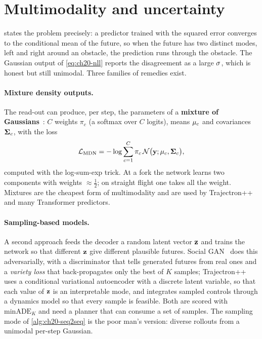 \section{Multimodality and uncertainty}
\label{sec:ch20-multimodal}

 states the problem precisely: a predictor
trained with the squared error converges to the conditional mean of the
future, so when the future has two distinct modes, left and right around an
obstacle, the prediction runs through the obstacle. The Gaussian output of
\cref{eq:ch20-nll} reports the disagreement as a large $\mathbf{\sigma}$, which
is honest but still unimodal. Three families of remedies exist.

\paragraph{Mixture density outputs.}
%
The read-out can produce, per step, the parameters of a \textbf{mixture of
Gaussians}~\cite{bishop1994mixture}: $C$ weights $\pi_c$ (a softmax over $C$
logits), means $\mathbf{\mu}_c$ and covariances $\mathbf{\Sigma}_c$, with the loss
\begin{equation}
  \mathcal{L}_{\mathrm{MDN}} = -\log \sum_{c=1}^{C} \pi_c\, \mathcal{N}\bigl(\mathbf{y}; \mathbf{\mu}_c, \mathbf{\Sigma}_c\bigr),
  \label{eq:ch20-mdn}
\end{equation}
computed with the log-sum-exp trick. At a fork the network learns two
components with weights $\approx \tfrac12$; on straight flight one takes all
the weight. Mixtures are the cheapest form of multimodality and are used by
Trajectron++ and many Transformer predictors.

\paragraph{Sampling-based models.}
%
A second approach feeds the decoder a random latent vector $\mathbf{z}$ and
trains the network so that different $\mathbf{z}$ give different plausible
futures. Social GAN~\cite{gupta2018social} does this adversarially, with a
discriminator that tells generated futures from real ones and a \emph{variety
loss} that back-propagates only the best of $K$ samples;
Trajectron++~\cite{salzmann2020trajectron} uses a conditional variational
autoencoder with a discrete latent variable, so that each value of $\mathbf{z}$
is an interpretable mode, and integrates sampled controls through a dynamics
model so that every sample is feasible. Both are scored with
$\mathrm{minADE}_K$ and need a planner that can consume a set of samples. The
sampling mode of \cref{alg:ch20-seq2seq} is the poor man's version: diverse
rollouts from a unimodal per-step Gaussian.

